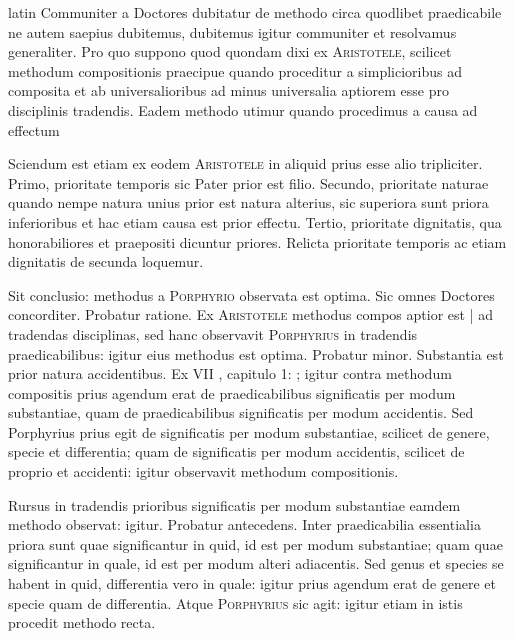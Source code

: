 \begin{otherlanguage*}{latin}
\pstart
  Communiter a Doctores dubitatur de methodo circa quodlibet praedicabile ne autem saepius dubitemus, dubitemus igitur communiter et resolvamus generaliter. Pro quo suppono quod quondam dixi ex \textsc{Aristotele}, scilicet methodum compositionis praecipue quando proceditur a simplicioribus ad composita et ab universalioribus ad minus universalia aptiorem esse pro disciplinis tradendis. Eadem methodo utimur quando procedimus a causa ad effectum 
\pend

\pstart
  Sciendum est etiam ex eodem \textsc{Aristotele } in  aliquid prius esse alio tripliciter. Primo, prioritate temporis sic Pater prior est filio. Secundo, prioritate naturae quando nempe natura unius prior est natura alterius, sic superiora sunt priora inferioribus et hac etiam causa est prior effectu. Tertio, prioritate dignitatis, qua honorabiliores et praepositi dicuntur priores. Relicta prioritate temporis ac etiam dignitatis de secunda loquemur. 
\pend

\pstart
  Sit conclusio: methodus a \textsc{Porphyrio} observata est optima. Sic omnes Doctores concorditer. Probatur ratione. Ex \textsc{Aristotele} methodus compos aptior est \textnormal{|} ad tradendas disciplinas, sed hanc observavit \textsc{Porphyrius} in tradendis praedicabilibus: igitur eius methodus est optima. Probatur minor. Substantia est prior natura accidentibus. Ex  VII , capitulo 1: ; igitur contra methodum compositis prius agendum erat de praedicabilibus significatis per modum substantiae, quam de praedicabilibus significatis per modum accidentis. Sed Porphyrius prius egit de significatis per modum substantiae, scilicet de genere, specie et differentia; quam de significatis per modum accidentis, scilicet de proprio et accidenti: igitur observavit methodum compositionis. 
\pend

\pstart
  Rursus in tradendis prioribus significatis per modum substantiae eamdem methodo observat: igitur. Probatur antecedens. Inter praedicabilia essentialia priora sunt quae significantur in quid, id est per modum substantiae; quam quae significantur in quale, id est per modum alteri adiacentis. Sed genus et species se habent in quid, differentia vero in quale: igitur prius agendum erat de genere et specie quam de differentia. Atque \textsc{Porphyrius} sic agit: igitur etiam in istis procedit methodo recta. 
\pend


\end{otherlanguage*}

